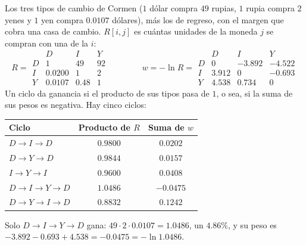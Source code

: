 \documentclass[11pt,letterpaper]{article}
\begin{document}
\begin{ejemplo}
  \label{ej:caminos-arbitraje}
  Los tres tipos de cambio de Cormen ($1$ dólar compra $49$ rupias,
  $1$ rupia compra $2$ yenes y $1$ yen compra $0.0107$ dólares), más
  los de regreso, con el margen que cobra una casa de cambio. $R[i, j]$
  es cuántas unidades de la moneda $j$ se compran con una de la $i$:
  \[
    R = \begin{array}{c|ccc}
          & D & I & Y \\ \hline
        D & 1 & 49 & 92 \\
        I & 0.0200 & 1 & 2 \\
        Y & 0.0107 & 0.48 & 1
      \end{array}
    \qquad\qquad
    w = -\ln R = \begin{array}{c|ccc}
          & D & I & Y \\ \hline
        D & 0 & -3.892 & -4.522 \\
        I & 3.912 & 0 & -0.693 \\
        Y & 4.538 & 0.734 & 0
      \end{array}
  \]
  Un ciclo da ganancia si el producto de sus tipos pasa de $1$, o sea,
  si la suma de sus pesos es negativa. Hay cinco ciclos:
  \begin{center}
  \small
  \begin{tabular}{lcc}
    \toprule
    \textbf{Ciclo} & \textbf{Producto de $R$}
      & \textbf{Suma de $w$} \\
    \midrule
    $D \to I \to D$ & $0.9800$ & $0.0202$ \\
    $D \to Y \to D$ & $0.9844$ & $0.0157$ \\
    $I \to Y \to I$ & $0.9600$ & $0.0408$ \\
    $D \to I \to Y \to D$ & $1.0486$ & $-0.0475$ \\
    $D \to Y \to I \to D$ & $0.8832$ & $0.1242$ \\
    \bottomrule
  \end{tabular}
  \end{center}
  Solo $D \to I \to Y \to D$ gana: $49 \cdot 2 \cdot 0.0107 = 1.0486$,
  un $4.86\%$, y su peso es
  $-3.892 - 0.693 + 4.538 = -0.0475 = -\ln 1.0486$.
  \begin{center}
\end{center}
\end{ejemplo}
\end{document}
